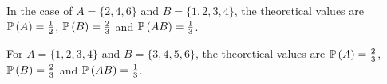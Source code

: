 \begin{ex}~
  \inputminted{python}{../code/01-22.py}
  \inputminted{text}{../output/01-22.txt}
\end{ex}

\begin{ex}~
  \inputminted{python}{../code/01-23.py}
  \inputminted{text}{../output/01-23.txt}

  In the case of $A=\{2, 4, 6\}$ and $B=\{1, 2, 3, 4\}$, the theoretical values
  are $\P{A}=\frac{1}{2}$, $\P{B}=\frac{2}{3}$ and $\P{AB}=\frac{1}{3}$.

  For $A=\{1, 2, 3, 4\}$ and $B=\{3, 4, 5, 6\}$, the theoretical values are
  $\P{A}=\frac{2}{3}$, $\P{B}=\frac{2}{3}$ and $\P{AB}=\frac{1}{3}$.
\end{ex}